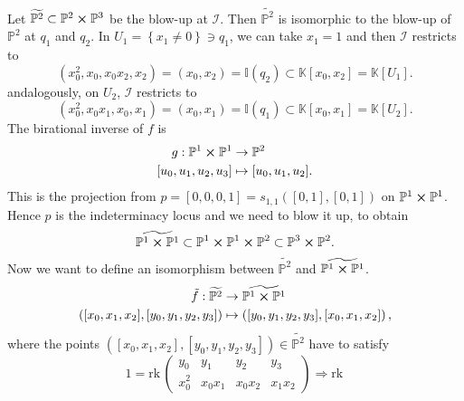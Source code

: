 \begin{ex}
	Let $\widetilde{\mathbb{P}^{2}} \subset \mathbb{P}^{2} \cross \mathbb{P}^{3}$ be the blow-up at $\mathcal{I}$.
	Then $\widetilde{\mathbb{P}^{2}}$ is isomorphic to the blow-up
	of $\mathbb{P}^{2}$ at $q_1$ and $q_2$.
	In $U_1 = \left\{ x_1 \neq 0 \right\} \ni q_1$, we can take $x_1 = 1$ and then $\mathcal{I}$
	restricts to 
	\begin{equation}
	\left( x_0^2, x_0, x_0x_2, x_2 \right) = \left( x_0, x_2 \right) =
	\mathbb{I}(q_2) \subset \mathbb{K}\left[x_0, x_2 \right] = \mathbb{K}[U_1]
	.\end{equation} 
	andalogously, on $U_2$, $\mathcal{I}$ restricts to 
	\begin{equation}
		\left( x_0^2, x_0x_1, x_0, x_1 \right) = \left( x_0, x_1 \right) =
		\mathbb{I}(q_1) \subset \mathbb{K}\left[x_0, x_1 \right] = \mathbb{K}[U_2]
	.\end{equation} 
	The birational inverse of $f$ is
	\begin{align}
		g: \mathbb{P}^{1} \cross \mathbb{P}^{1} &\to \mathbb{P}^{2} \\
		[u_0, u_1, u_2, u_3] &\mapsto [u_0, u_1, u_2]
	.\end{align} 
	This is the projection from $p = [0,0,0,1] = s_{1,1} \left( [0,1],[0,1] \right)$
	on $\mathbb{P}^{1} \cross \mathbb{P}^{1}$.
	Hence $p$ is the indeterminacy locus and we need
	to blow it up, to obtain
	\begin{equation}
	\widetilde{\mathbb{P}^{1} \cross \mathbb{P}^{1}} \subset \mathbb{P}^{1} \cross \mathbb{P}^{1} \cross \mathbb{P}^{2}
	\subset \mathbb{P}^{3} \cross \mathbb{P}^{2}
	.\end{equation} 
	Now we want to define an isomorphism between $\widetilde{\mathbb{P}^{2}}$ and $\widetilde{\mathbb{P}^{1} \cross \mathbb{P}^{1}}$.
	\begin{align}
		\tilde{f}: \widetilde{\mathbb{P}^{2}} &\to \widetilde{\mathbb{P}^{1} \cross \mathbb{P}^{1}} \\
		\left( [x_0, x_1, x_2], [y_0, y_1, y_2, y_3] \right) &\mapsto 
		\left( [y_0,y_1, y_2, y_3], [x_0, x_1, x_2] \right)
	,\end{align} 
	where the points $\left( [x_0, x_1, x_2], [y_0, y_1, y_2, y_3] \right) \in \widetilde{\mathbb{P}^{2}}$
	have to satisfy
	\begin{equation}
	1 = \mathrm{rk}\, 
	\begin{pmatrix}
		y_0 & y_1 & y_2 & y_3\\
		x_0^2 & x_0x_1 & x_0x_2 & x_1x_2
	\end{pmatrix}
	\Rightarrow \mathrm{rk}\, 

\end{equation}
\end{ex}
